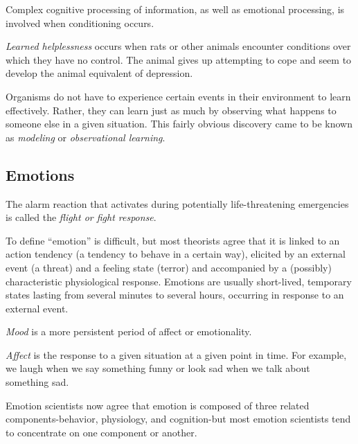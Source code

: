 Complex cognitive processing of information, as well as emotional processing, is involved when conditioning occurs.

\begin{definition}\label{def:Learned_Helplessness}
  \emph{Learned helplessness} occurs when rats or other animals encounter conditions over which they have no control.
  The animal gives up attempting to cope and seem to develop the animal equivalent of depression.
\end{definition}

Organisms do not have to experience certain events in their environment to learn effectively.
Rather, they can learn just as much by observing what happens to someone else in a given situation.
This fairly obvious discovery came to be known as \emph{modeling} or \emph{observational learning}.

\subsection{Emotions}\label{subsec:Emotions}
The alarm reaction that activates during potentially life-threatening emergencies is called the \emph{flight or fight response}.

To define ``emotion'' is difficult, but most theorists agree that it is linked to an action tendency (a tendency to behave in a certain way), elicited by an external event (a threat) and a feeling state (terror) and accompanied by a (possibly) characteristic physiological response.
Emotions are usually short-lived, temporary states lasting from several minutes to several hours, occurring in response to an external event.

\begin{definition}[Mood]\label{def:Mood}
  \emph{Mood} is a more persistent period of affect or emotionality.
\end{definition}

\begin{definition}[Affect]\label{def:Affect}
  \emph{Affect} is the response to a given situation at a given point in time.
  For example, we laugh when we say something funny or look sad when we talk about something sad.
\end{definition}

Emotion scientists now agree that emotion is composed of three related components-behavior, physiology, and cognition-but most emotion scientists tend to concentrate on one component or another.

